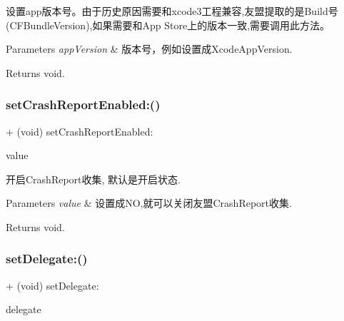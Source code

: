 设置app版本号。由于历史原因需要和xcode3工程兼容,友盟提取的是\+Build号(\+C\+F\+Bundle\+Version),如果需要和\+App Store上的版本一致,需要调用此方法。


\begin{DoxyParams}{Parameters}
{\em app\+Version} & 版本号，例如设置成{\ttfamily Xcode\+App\+Version}. \\
\hline
\end{DoxyParams}
\begin{DoxyReturn}{Returns}
void. 
\end{DoxyReturn}
\mbox{\label{interfaceMobClick_a00b8fff5d1fc59e7bb0b740db5cf7b5e}} 
\subsubsection{\texorpdfstring{set\+Crash\+Report\+Enabled\+:()}{setCrashReportEnabled:()}}
{\footnotesize\ttfamily + (void) set\+Crash\+Report\+Enabled\+: \begin{DoxyParamCaption}\item[{(B\+O\+OL)}]{value }\end{DoxyParamCaption}}

开启\+Crash\+Report收集, 默认是开启状态.


\begin{DoxyParams}{Parameters}
{\em value} & 设置成\+NO,就可以关闭友盟\+Crash\+Report收集. \\
\hline
\end{DoxyParams}
\begin{DoxyReturn}{Returns}
void. 
\end{DoxyReturn}
\mbox{\label{interfaceMobClick_acc2fa4f98ba0717fb6ac965f94d57d5f}} 
\subsubsection{\texorpdfstring{set\+Delegate\+:()}{setDelegate:()}}
{\footnotesize\ttfamily + (void) set\+Delegate\+: \begin{DoxyParamCaption}\item[{(id)}]{delegate }\end{DoxyParamCaption}}

